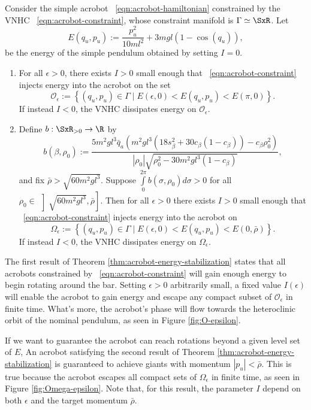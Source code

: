 \begin{thm}\label{thm:acrobot-energy-stabilization}
    Consider the simple acrobot ~\eqref{eqn:acrobot-hamiltonian} constrained by
    the VNHC ~\eqref{eqn:acrobot-constraint}, whose
    constraint manifold is \(\Gamma \simeq \SxR\).
    Let 
    \[
        E(q_u,p_u) := \frac{p_u^2}{10ml^2} + 3mgl(1 - \cos(q_u))
        ,
    \]
    be the energy of the simple pendulum obtained by setting \(I = 0\).
\begin{enumerate}
    \item For all \(\epsilon > 0\), there exists \(I > 0\) small enough that 
    ~\eqref{eqn:acrobot-constraint} injects energy into the acrobot on the set
    \[
        \mathcal{O}_\epsilon := \left\{(q_u,p_u) \in \Gamma 
        \mid E(\epsilon,0) < E(q_u,p_u) < E(\pi,0) \right\}
        .
    \]
    If instead \(I < 0\), the VNHC dissipates energy on \(\mathcal{O}_\epsilon\).
\item Define \(b : \SxR_{> 0} \rightarrow \R\) by
    \[
        b(\beta,\rho_0) := 
        \frac{5m^2 g l^3 \bar{q}_a \left(
            m^2gl^3\left(18s_\beta^2 + 30c_\beta(1 - c_\beta)\right)
            - c_\beta\rho_0^2
        \right)}{
        |\rho_0|\sqrt{\rho_0^2 - 30m^2gl^3(1 - c_\beta)}
        }
        ,
    \]
    and fix \(\bar{\rho} > \sqrt{60m^2gl^3}\).
    Suppose \(\int \limits_{0}^{2\pi} b(\sigma,\rho_0)d\sigma > 0\) for all 
    \(\rho_0 \in \, \left]\sqrt{60m^2gl^3}, \bar{\rho}\right]\).
    Then for all \(\epsilon > 0\) there exists \(I > 0\) small enough that
    ~\eqref{eqn:acrobot-constraint} injects energy into the acrobot on
    \[
        \Omega_\epsilon := \left\{(q_u,p_u) \in \Gamma 
        \mid E(\epsilon,0) < E(q_u,p_u) < E(0,\bar{\rho})\right\}
        .
    \]
    If instead \(I < 0\), the VNHC dissipates energy on \(\Omega_\epsilon\).
\end{enumerate}
\end{thm}

The first result of Theorem \ref{thm:acrobot-energy-stabilization} states
that all acrobots constrained by ~\eqref{eqn:acrobot-constraint} 
will gain enough energy to begin rotating around the bar.
Setting \(\epsilon > 0\) arbitrarily small, a fixed value
\(I(\epsilon)\) will enable the acrobot to gain energy and escape any compact
subset of \(\mathcal{O}_\epsilon\) in finite time. 
What's more, the acrobot's phase will flow towards the heteroclinic orbit of the
nominal pendulum, as seen in Figure \ref{fig:O-epsilon}.

If we want to guarantee the acrobot can reach rotations beyond a given level set
of \(E\), 
An acrobot satisfying the second result of Theorem
\ref{thm:acrobot-energy-stabilization} is guaranteed to achieve giants with
momentum \(|p_u| < \bar{\rho}\).
This is true because the acrobot escapes all compact sets of \(\Omega_\epsilon\)
in finite time, as seen in Figure \ref{fig:Omega-epsilon}.
Note that, for this result, the parameter \(I\) depend on both \(\epsilon\) and
the target momentum \(\bar{\rho}\).

